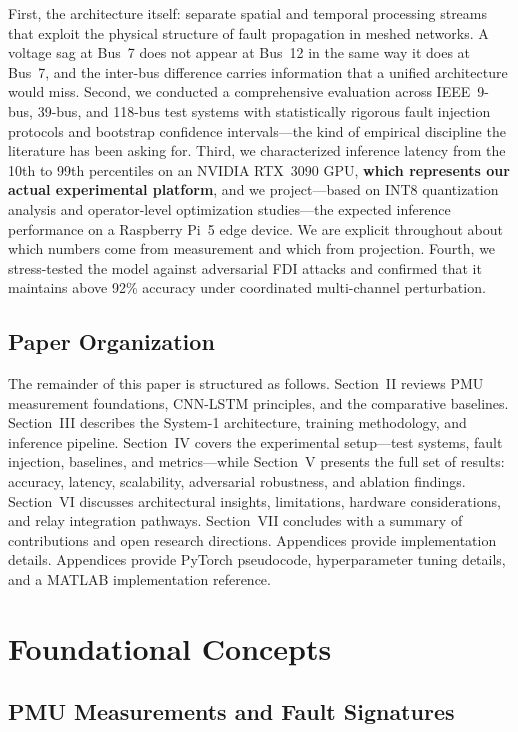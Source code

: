\documentclass[journal]{IEEEtran}
\begin{document}
First, the architecture itself: separate spatial and temporal processing streams that exploit the physical structure of fault propagation in meshed networks. A voltage sag at Bus~7 does not appear at Bus~12 in the same way it does at Bus~7, and the inter-bus difference carries information that a unified architecture would miss. Second, we conducted a comprehensive evaluation across IEEE~9-bus, 39-bus, and 118-bus test systems with statistically rigorous fault injection protocols and bootstrap confidence intervals---the kind of empirical discipline the literature has been asking for. Third, we characterized inference latency from the 10th to 99th percentiles on an NVIDIA RTX~3090 GPU, \textbf{which represents our actual experimental platform}, and we project---based on INT8 quantization analysis and operator-level optimization studies---the expected inference performance on a Raspberry Pi~5 edge device. We are explicit throughout about which numbers come from measurement and which from projection. Fourth, we stress-tested the model against adversarial FDI attacks and confirmed that it maintains above 92\% accuracy under coordinated multi-channel perturbation.

\subsection{Paper Organization}

The remainder of this paper is structured as follows. Section~II reviews PMU measurement foundations, CNN-LSTM principles, and the comparative baselines. Section~III describes the System-1 architecture, training methodology, and inference pipeline. Section~IV covers the experimental setup---test systems, fault injection, baselines, and metrics---while Section~V presents the full set of results: accuracy, latency, scalability, adversarial robustness, and ablation findings. Section~VI discusses architectural insights, limitations, hardware considerations, and relay integration pathways. Section~VII concludes with a summary of contributions and open research directions. Appendices provide implementation details. Appendices provide PyTorch pseudocode, hyperparameter tuning details, and a MATLAB implementation reference.

\section{Foundational Concepts}
\label{sec:foundations}

\subsection{PMU Measurements and Fault Signatures}
\end{document}
